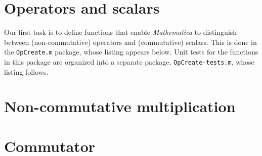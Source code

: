 \documentclass[12pt,letterpaper]{refart}
\begin{document}
%
%
%
%
%
%
%
%
%
%

\cite{Helton2015feb} \cite{Levitt2015mar}

\section{Operators and scalars}

Our first task is to define functions that enable \emph{Mathematica} to distinguish between (non-commutative) operators and (commutative) scalars.  This is done in the \verb+OpCreate.m+ package, whose listing appears below.  Unit tests for the functions in this package are organized into a separate package, \verb+OpCreate-tests.m+, whose listing follows. 




\section{Non-commutative multiplication}




\section{Commutator}
\end{document}
